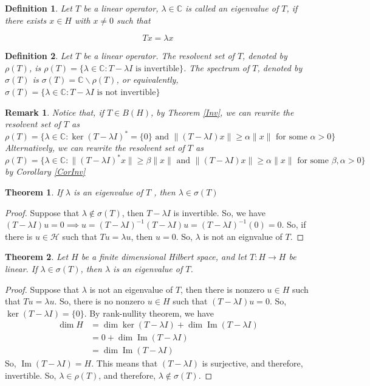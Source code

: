 \documentclass{report}
\newtheorem{thm}{Theorem}
\newtheorem{defn}{Definition}
\newtheorem{rem}{Remark}
\newcommand{\im}{\operatorname{Im}}
\begin{document}
\begin{defn}
Let $T$ be a linear operator, $\lambda \in \mathbb{C}$ is called an eigenvalue of $T$, if there exists $x \in H$ with $x\not=0$ such that

$$
Tx=\lambda x
$$
\end{defn}

\begin{defn}
  Let $T$ be a linear operator. The resolvent set of $T$, denoted by $\rho(T)$, is $\rho(T) = \{\lambda\in\mathbb{C}: T-\lambda I\text{ is invertible}\}$. The spectrum of $T$, denoted by $\sigma(T)$ is $\sigma(T)=\mathbb{C}\backslash\rho(T)$, or equivalently, $\sigma(T) = \{\lambda\in\mathbb{C}: T-\lambda I\text{ is not invertible}\}$
\end{defn}

\begin{rem} \label{defRho}
  Notice that, if $T\in B(H)$, by Theorem \ref{Inv}, we can rewrite the resolvent set of $T$ as
  $$
  \rho(T) = \{\lambda\in\mathbb{C}: \operatorname{ker}(T-\lambda I)^{*}=\{0\}\text{ and }\lVert (T-\lambda I)x\rVert\geq\alpha\lVert x\rVert\text{ for some }\alpha>0\}
  $$
  Alternatively, we can rewrite the resolvent set of $T$ as
  $$
  \rho(T) = \{\lambda\in\mathbb{C}: \lVert (T-\lambda I)^{*}x\rVert\geq\beta\lVert x\rVert\text{ and }\lVert (T-\lambda I)x\rVert\geq\alpha\lVert x\rVert\text{ for some }\beta,\alpha>0\}
  $$
  by Corollary \ref{CorInv}
\end{rem}

\begin{thm}
If $\lambda$ is an eigenvalue of $T$ , then $\lambda \in \sigma(T)$
\end{thm}
\begin{proof}
  Suppose that $\lambda\notin\sigma(T)$, then $T-\lambda I$ is invertible. So, we have $(T-\lambda I)u=0\implies u = (T-\lambda I)^{-1}(T-\lambda I)u = (T-\lambda I)^{-1}(0)=0$. So, if there is $u\in\mathcal{H}$ such that $Tu=\lambda u$, then $u=0$. So, $\lambda$ is not an eignvalue of $T$.
\end{proof}

\begin{thm}
  Let $H$ be a finite dimensional Hilbert space, and let $T:H\to H$ be linear. If $\lambda\in\sigma(T)$, then $\lambda$ is an eigenvalue of $T$.
\end{thm}
\begin{proof}
  Suppose that $\lambda$ is not an eigenvalue of $T$, then there is nonzero $u\in H$ such that $Tu=\lambda u$. So, there is no nonzero $u\in H$ such that $(T-\lambda I)u=0$. So, $\ker(T-\lambda I)=\{0\}$. By rank-nullity theorem, we have
  $$
  \begin{aligned}
    \dim H &= \dim\ker(T-\lambda I) + \dim\im(T-\lambda I) \\
           &= 0 + \dim\im(T-\lambda I) \\
           &= \dim\im(T-\lambda I)
  \end{aligned}
  $$
  So, $\im(T-\lambda I)=H$. This means that $(T-\lambda I)$ is surjective, and therefore, invertible. So, $\lambda\in\rho(T)$, and therefore, $\lambda\notin\sigma(T)$.
\end{proof}
\end{document}
